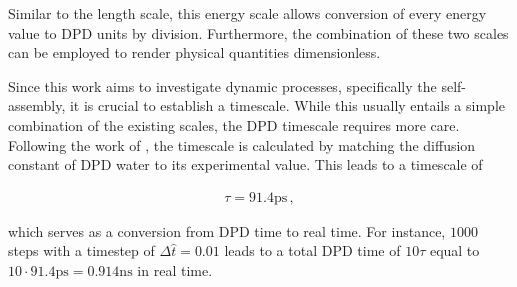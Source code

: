 \documentclass[
    11pt,
    a4paper,
    oneside,        %
    BCOR=10mm,      %
    parskip=half,   %
    listof=nototoc,   %
    bibliography=totoc %
]{scrreprt}
\begin{document}
Similar to the length scale, this energy scale allows conversion of every energy value to DPD units by division. Furthermore, the combination of these two scales can be employed to render physical quantities dimensionless. 

Since this work aims to investigate dynamic processes, specifically the self-assembly, it is crucial to establish a timescale. While this usually entails a simple combination of the existing scales, the DPD timescale requires more care. Following the work of \citeauthor{Wang2024} \cite{Wang2024}, the timescale is calculated by matching the diffusion constant of DPD water to its experimental value. This leads to a timescale of 

\begin{align}
    \tau = 91.4\si{\pico\s}\, ,
\end{align}

which serves as a conversion from DPD time to real time. For instance, $1000$ steps with a timestep of $\Delta \hat{t} = 0.01$ leads to a total DPD time of $10\tau$ equal to $10 \cdot 91.4\si{\pico\s} = 0.914 \si{\nano\s}$ in real time.
\end{document}
